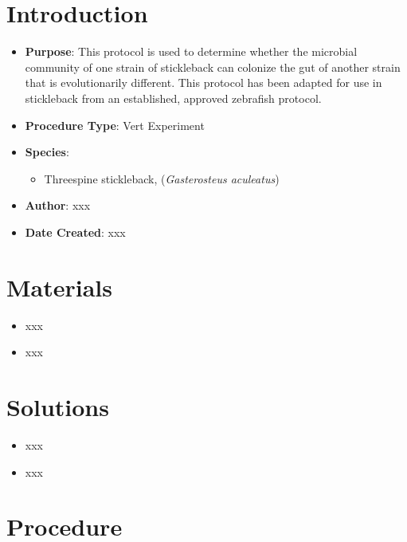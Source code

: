 \documentclass[
  letterpaper,
  DIV=11,
  numbers=noendperiod]{scrreprt}
\providecommand{\tightlist}{%
  \setlength{\itemsep}{0pt}\setlength{\parskip}{0pt}}\usepackage{longtable,booktabs,array}
\begin{document}
\hypertarget{introduction-57}{%
\section{Introduction}\label{introduction-57}}

\begin{itemize}
\tightlist
\item
  \textbf{Purpose}: This protocol is used to determine whether the
  microbial community of one strain of stickleback can colonize the gut
  of another strain that is evolutionarily different. This protocol has
  been adapted for use in stickleback from an established, approved
  zebrafish protocol.
\item
  \textbf{Procedure Type}: Vert Experiment
\item
  \textbf{Species}:

  \begin{itemize}
  \tightlist
  \item
    Threespine stickleback, (\emph{Gasterosteus aculeatus})
  \end{itemize}
\item
  \textbf{Author}: xxx
\item
  \textbf{Date Created}: xxx
\end{itemize}

\hypertarget{materials-53}{%
\section{Materials}\label{materials-53}}

\begin{itemize}
\tightlist
\item
  xxx
\item
  xxx
\end{itemize}

\hypertarget{solutions-50}{%
\section{Solutions}\label{solutions-50}}

\begin{itemize}
\tightlist
\item
  xxx
\item
  xxx
\end{itemize}

\hypertarget{procedure-53}{%
\section{Procedure}\label{procedure-53}}
\end{document}
